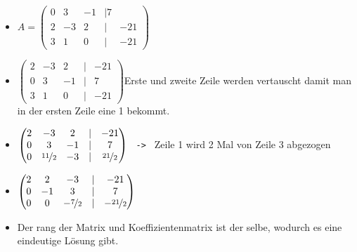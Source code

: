\documentclass{article}
\begin{document}
\begin{itemize}
\begin{itemize}
			\begin{itemize}
				\item{$A=\begin{pmatrix} 0 & 3 & -1 & | 7 \\ 2 & -3 & 2 & | & -21 \\ 3 & 1 & 0 & | & -21 \end{pmatrix}$}
				\item{$\begin{pmatrix} 2 & -3 & 2 & | & -21 \\ 0 & 3 & -1 & | & 7 \\ 3 & 1 & 0 & | & -21 \end{pmatrix}$Erste und zweite Zeile werden vertauscht damit man in der ersten Zeile eine 1 bekommt.}
				\item{$\begin{pmatrix} 2 & -3 & 2 & | & -21 \\ 0 & 3 & -1 & | & 7 \\ 0 & \nicefrac{11}{2} & -3 & | & \nicefrac{21}{2} \end{pmatrix}$ \texttt{ -> } Zeile 1 wird 2 Mal von Zeile 3 abgezogen}
				\item{$\begin{pmatrix} 2 & 2 & -3 & | & -21 \\ 0 & -1 & 3 & | & 7 \\ 0 & 0 & -\nicefrac{7}{2} & | & -\nicefrac{21}{2} \end{pmatrix}$}
				\item{Der rang der Matrix und Koeffizientenmatrix ist der selbe, wodurch es eine eindeutige Lösung gibt.}


\end{itemize}
\end{itemize}
\end{itemize}
\end{document}
